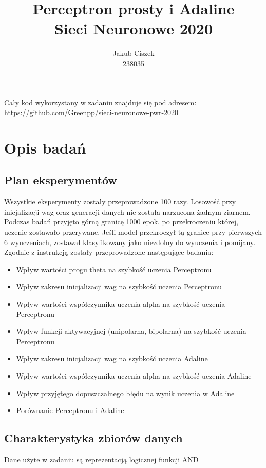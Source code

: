 \documentclass{article}
\title{  Perceptron prosty i Adaline\\Sieci Neuronowe 2020 }
\author{
  Jakub Ciszek \\
  238035\\
}
\begin{document}
\maketitle

\newpage
\tableofcontents
\newpage

Cały kod wykorzystany w zadaniu znajduje się pod adresem: \url{https://github.com/Greenpp/sieci-neuronowe-pwr-2020}

\section{Opis badań}
\subsection{Plan eksperymentów}

Wszystkie eksperymenty zostały przeprowadzone 100 razy. Losowość przy inicjalizacji wag oraz generacji danych nie została narzucona żadnym ziarnem. Podczas badań przyjęto górną granicę 1000 epok, po przekroczeniu której, uczenie zostawało przerywane. Jeśli  model przekroczył tą granice przy pierwszych 6 wyuczeniach, zostawał klasyfikowany jako niezdolny do wyuczenia i pomijany. Zgodnie z instrukcją zostały przeprowadzone następujące badania:
\begin{itemize}
	\item Wpływ wartości progu theta na szybkość uczenia Perceptronu
	\item Wpływ zakresu inicjalizacji wag na szybkość uczenia Perceptronu
	\item Wpływ wartości współczynnika uczenia alpha na szybkość uczenia Perceptronu
	\item Wpływ funkcji aktywacyjnej (unipolarna, bipolarna) na szybkość uczenia Perceptronu
	\item Wpływ zakresu inicjalizacji wag na szybkość uczenia Adaline
	\item Wpływ wartości współczynnika uczenia alpha na szybkość uczenia Adaline
	\item Wpływ przyjętego dopuszczalnego błędu na wynik uczenia w Adaline
	\item Porównanie Perceptronu i Adaline
\end{itemize}

\subsection{Charakterystyka zbiorów danych}

Dane użyte w zadaniu są reprezentacją logicznej funkcji AND
\end{document}
